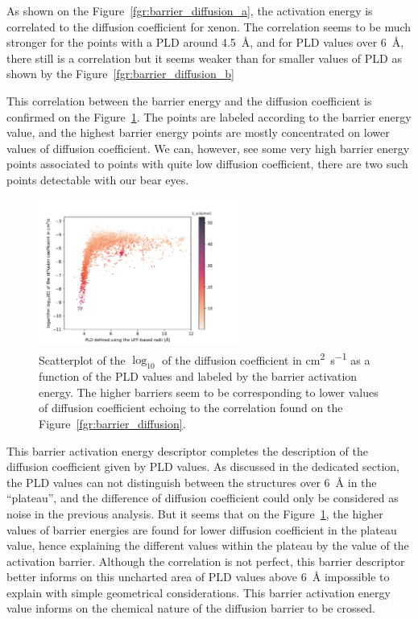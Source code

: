 \documentclass[main]{subfiles}
\begin{document}
As shown on the Figure~\ref{fgr:barrier_diffusion_a}, the activation energy is correlated to the diffusion coefficient for xenon. The correlation seems to be much stronger for the points with a PLD around \SI{4.5}{\angstrom}, and for PLD values over \SI{6}{\angstrom}, there still is a correlation but it seems weaker than for smaller values of PLD as shown by the Figure~\ref{fgr:barrier_diffusion_b}

This correlation between the barrier energy and the diffusion coefficient is confirmed on the Figure~\ref{fgr:diff_pld_barrier}. The points are labeled according to the barrier energy value, and the highest barrier energy points are mostly concentrated on lower values of diffusion coefficient. We can, however, see some very high barrier energy points associated to points with quite low diffusion coefficient, there are two such points detectable with our bear eyes. 

\begin{figure}[ht]
  \centering
    \includegraphics[width=0.6\textwidth]{figures/5-diffusion/difflog_Df-uff298K_barrier.pdf}
    \caption{ Scatterplot of the $\log_{10}$ of the diffusion coefficient in \si{\square\cm\per\s} as a function of the PLD values and labeled by the barrier activation energy. The higher barriers seem to be corresponding to lower values of diffusion coefficient echoing to the correlation found on the Figure~\ref{fgr:barrier_diffusion}.}\label{fgr:diff_pld_barrier}
\end{figure}

This barrier activation energy descriptor completes the description of the diffusion coefficient given by PLD values. As discussed in the dedicated section, the PLD values can not distinguish between the structures over \SI{6}{\angstrom} in the ``plateau'', and the difference of diffusion coefficient could only be considered as noise in the previous analysis. But it seems that on the Figure~\ref{fgr:diff_pld_barrier}, the higher values of barrier energies are found for lower diffusion coefficient in the plateau value, hence explaining the different values within the plateau by the value of the activation barrier. 
Although the correlation is not perfect, this barrier descriptor better informs on this uncharted area of PLD values above \SI{6}{\angstrom} impossible to explain with simple geometrical considerations. This barrier activation energy value informs on the chemical nature of the diffusion barrier to be crossed. 
\end{document}
